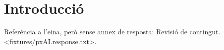 \documentclass[CAT,MEM,AI,no-cover,no-toc]{P3CTeX}
\begin{document}
\chapter{Introducció}
Referència a l'eina, però sense annex de resposta:
  {Revisió de contingut.}
  <fixtures/pxAI.response.txt>.
\end{document}

